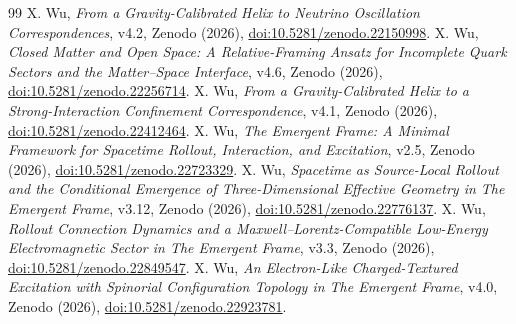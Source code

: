 \documentclass[11pt]{article}
\begin{document}
\begin{thebibliography}{99}
 X. Wu, \emph{From a Gravity-Calibrated Helix to Neutrino Oscillation Correspondences}, v4.2, Zenodo (2026), \href{https://doi.org/10.5281/zenodo.22150998}{doi:10.5281/zenodo.22150998}.
 X. Wu, \emph{Closed Matter and Open Space: A Relative-Framing Ansatz for Incomplete Quark Sectors and the Matter--Space Interface}, v4.6, Zenodo (2026), \href{https://doi.org/10.5281/zenodo.22256714}{doi:10.5281/zenodo.22256714}.
 X. Wu, \emph{From a Gravity-Calibrated Helix to a Strong-Interaction Confinement Correspondence}, v4.1, Zenodo (2026), \href{https://doi.org/10.5281/zenodo.22412464}{doi:10.5281/zenodo.22412464}.
 X. Wu, \emph{The Emergent Frame: A Minimal Framework for Spacetime Rollout, Interaction, and Excitation}, v2.5, Zenodo (2026), \href{https://doi.org/10.5281/zenodo.22723329}{doi:10.5281/zenodo.22723329}.
 X. Wu, \emph{Spacetime as Source-Local Rollout and the Conditional Emergence of Three-Dimensional Effective Geometry in The Emergent Frame}, v3.12, Zenodo (2026), \href{https://doi.org/10.5281/zenodo.22776137}{doi:10.5281/zenodo.22776137}.
 X. Wu, \emph{Rollout Connection Dynamics and a Maxwell--Lorentz-Compatible Low-Energy Electromagnetic Sector in The Emergent Frame}, v3.3, Zenodo (2026), \href{https://doi.org/10.5281/zenodo.22849547}{doi:10.5281/zenodo.22849547}.
 X. Wu, \emph{An Electron-Like Charged-Textured Excitation with Spinorial Configuration Topology in The Emergent Frame}, v4.0, Zenodo (2026), \href{https://doi.org/10.5281/zenodo.22923781}{doi:10.5281/zenodo.22923781}.
\end{thebibliography}
\endgroup
\end{document}
